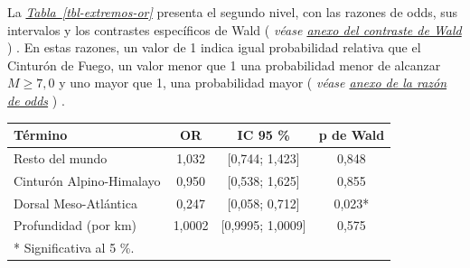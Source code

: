 \documentclass[
  spanish,
  letterpaper,
  DIV=11,
  numbers=noendperiod]{scrartcl}
\newcommand{\asesoriaStyledRef}[1]{%
  {\hypersetup{linkcolor=asesoriaLinkColor,urlcolor=asesoriaLinkColor,citecolor=asesoriaLinkColor}\textcolor{asesoriaLinkColor}{\emph{#1}}}%
}
\newcommand{\asesoriaParenRef}[1]{%
  \textnormal{\textcolor{asesoriaTextColor}{(}}%
  {\hypersetup{linkcolor=asesoriaLinkColor,urlcolor=asesoriaLinkColor,citecolor=asesoriaLinkColor}\textcolor{asesoriaTextColor}{\emph{#1}}}%
  \textnormal{\textcolor{asesoriaTextColor}{)}}%
}
\newcommand{\asesoriaTableLink}[1]{\hyperref[#1]{Tabla~\ref*{#1}}}
\newcommand{\asesoriaTableRef}[1]{\asesoriaStyledRef{\asesoriaTableLink{#1}}}
\begin{document}
\noindent
\begin{minipage}[t]{0.45\textwidth}
\vspace{0pt}
La \asesoriaTableRef{tbl-extremos-or} presenta el segundo nivel, con las razones de odds, sus intervalos y los contrastes específicos de Wald \asesoriaParenRef{véase \hyperref[sec-anexo-wald]{anexo del contraste de Wald}}. En estas razones, un valor de 1 indica igual probabilidad relativa que el Cinturón de Fuego, un valor menor que 1 una probabilidad menor de alcanzar $M \geq 7{,}0$ y uno mayor que 1, una probabilidad mayor \asesoriaParenRef{véase \hyperref[sec-anexo-or]{anexo de la razón de odds}}.
\end{minipage}\hfill
\begin{minipage}[t]{0.51\textwidth}
\vspace{0pt}
\begingroup
\scriptsize
\centering
\setlength{\tabcolsep}{0.8pt}
\renewcommand{\arraystretch}{0.90}
{}
\label{tbl-extremos-or}
\hypertarget{dest-tbl-extremos-or}{}
\begin{tabular*}{\linewidth}{@{\extracolsep{\fill}}lccc@{}}
\toprule
Término & OR & IC 95 \% & p de Wald \\
\midrule
Resto del mundo          & 1,032  & [0,744; 1,423]   & 0,848 \\
Cinturón Alpino-Himalayo & 0,950  & [0,538; 1,625]   & 0,855 \\
Dorsal Meso-Atlántica    & 0,247  & [0,058; 0,712]   & 0,023* \\
Profundidad (por km)     & 1,0002 & [0,9995; 1,0009] & 0,575 \\
\bottomrule
\multicolumn{4}{l}{* Significativa al 5 \%.} \\
\end{tabular*}
\par\vspace{0.10em}
\endgroup
\end{minipage}
\par\vspace{-0.25em}
\end{document}
